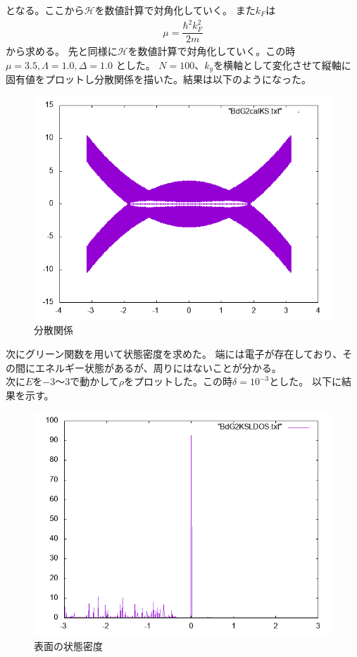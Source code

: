 \documentclass{jarticle}
\begin{document}
となる。ここから$\mathcal{H}$を数値計算で対角化していく。
また$k_{F}$は
\begin{align}
\mu=\dfrac{\hbar^{2}k_F^{2}}{2m}
\end{align}
から求める。
先と同様に$\mathcal{H}$を数値計算で対角化していく。この時$\mu=3.5, \Lambda=1.0, \Delta=1.0$	とした。
$N=100$、$k_y$を横軸として変化させて縦軸に固有値をプロットし分散関係を描いた。結果は以下のようになった。\\
\begin{figure}[H]
	\centering
	\includegraphics[scale=0.5]{BdG2calKS.png}
	\caption{分散関係}
\end{figure}
次にグリーン関数を用いて状態密度を求めた。
端には電子が存在しており、その間にエネルギー状態があるが、周りにはないことが分かる。\\
次に$E$を$-3$〜$3$で動かして$\rho$をプロットした。この時$\delta=10^{-3}$とした。
以下に結果を示す。
\begin{figure}[H]
	\centering
	\includegraphics[scale=0.5]{BdGKSLDOSedge.png}
	\caption{表面の状態密度}
\end{figure}
\end{document}

